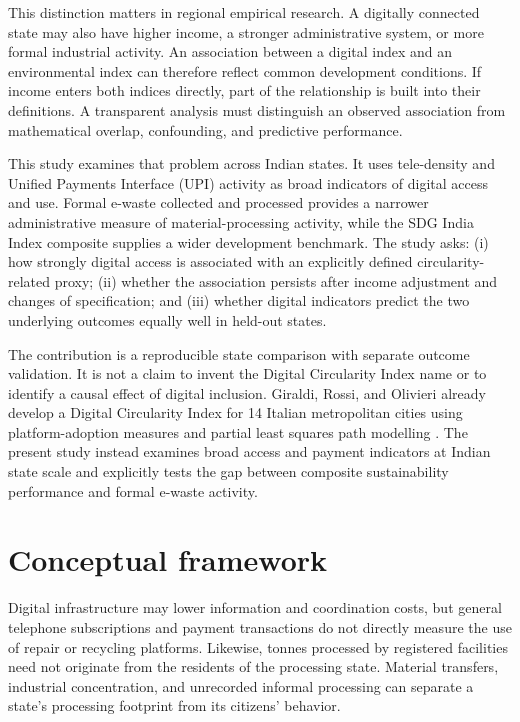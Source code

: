 \documentclass[11pt,a4paper]{article}
\begin{document}
This distinction matters in regional empirical research. A digitally connected state may also have higher income, a stronger administrative system, or more formal industrial activity. An association between a digital index and an environmental index can therefore reflect common development conditions. If income enters both indices directly, part of the relationship is built into their definitions. A transparent analysis must distinguish an observed association from mathematical overlap, confounding, and predictive performance.

This study examines that problem across Indian states. It uses tele-density and Unified Payments Interface (UPI) activity as broad indicators of digital access and use. Formal e-waste collected and processed provides a narrower administrative measure of material-processing activity, while the SDG India Index composite supplies a wider development benchmark. The study asks: (i) how strongly digital access is associated with an explicitly defined circularity-related proxy; (ii) whether the association persists after income adjustment and changes of specification; and (iii) whether digital indicators predict the two underlying outcomes equally well in held-out states.

The contribution is a reproducible state comparison with separate outcome validation. It is not a claim to invent the Digital Circularity Index name or to identify a causal effect of digital inclusion. Giraldi, Rossi, and Olivieri already develop a Digital Circularity Index for 14 Italian metropolitan cities using platform-adoption measures and partial least squares path modelling \cite{giraldi}. The present study instead examines broad access and payment indicators at Indian state scale and explicitly tests the gap between composite sustainability performance and formal e-waste activity.

\section{Conceptual framework}
Digital infrastructure may lower information and coordination costs, but general telephone subscriptions and payment transactions do not directly measure the use of repair or recycling platforms. Likewise, tonnes processed by registered facilities need not originate from the residents of the processing state. Material transfers, industrial concentration, and unrecorded informal processing can separate a state's processing footprint from its citizens' behavior.
\end{document}
